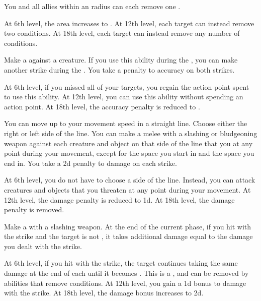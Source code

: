 {             You and all allies within an \areamed radius can each remove one .
            \par At 6th level, the area increases to \arealarge.
            At 12th level, each target can instead remove two conditions.
            At 18th level, each target can instead remove any number of conditions.

             Make a  against a creature.
            If you use this ability during the , you can make another strike during the .
            You take a  penalty to accuracy on both strikes.
            \par At 6th level, if you missed all of your targets, you regain the action point spent to use this ability.
            At 12th level, you can use this ability without spending an action point.
            At 18th level, the accuracy penalty is reduced to .

             You can move up to your movement speed in a straight line.
            Choose either the right or left side of the line.
            You can make a melee  with a slashing or bludgeoning weapon against each creature and object on that side of the line that you  at any point during your movement, except for the space you start in and the space you end in.
            You take a \minus2d penalty to damage on each strike.
            \par At 6th level, you do not have to choose a side of the line.
            Instead, you can attack creatures and objects that you threaten at any point during your movement.
            At 12th level, the damage penalty is reduced to \minus1d.
            At 18th level, the damage penalty is removed.

             Make a  with a slashing weapon.
            At the end of the current phase, if you hit with the strike and the target is not , it takes additional damage equal to the damage you dealt with the strike.
            \par At 6th level, if you hit with the strike, the target continues taking the same damage at the end of each  until it becomes .
            This is a , and can be removed by abilities that remove conditions.
            At 12th level, you gain a \plus1d bonus to damage with the strike.
            At 18th level, the damage bonus increases to \plus2d.

}
